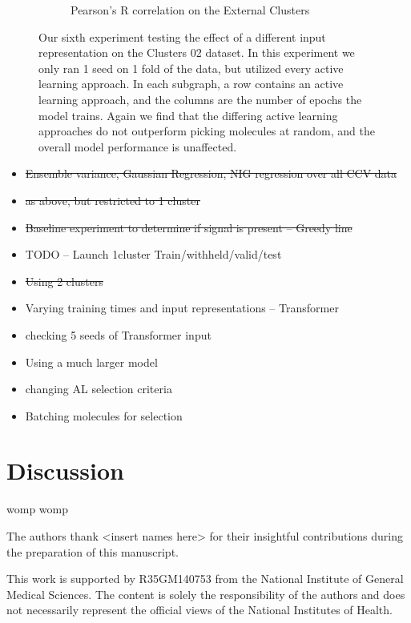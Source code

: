 \documentclass[journal=jmcmar,manuscript=article]{achemso}
\begin{document}
\begin{figure}[tbph]
\begin{subfigure}[b]{0.48\textwidth}
        \caption{Pearson's R correlation on the External Clusters}
    \end{subfigure}
    \caption{Our sixth experiment testing the effect of a different input representation on the Clusters 02 dataset. In this experiment we only ran 1 seed on 1 fold of the data, but utilized every active learning approach. In each subgraph, a row contains an active learning approach, and the columns are the number of epochs the model trains. Again we find that the differing active learning approaches do not outperform picking molecules at random, and the overall model performance is unaffected.}
    \label{fig:MATinput}
\end{figure}

\begin{itemize}
    \item \st{Ensemble variance, Gaussian Regression, NIG regression over all CCV data}
    \item \st{as above, but restricted to 1 cluster}
    \item \st{Baseline experiment to determine if signal is present -- Greedy line}
    \item TODO -- Launch 1cluster Train/withheld/valid/test
    \item \st{Using 2 clusters}
    \item Varying training times and input representations -- Transformer
    \item checking 5 seeds of Transformer input
    \item Using a much larger model
    \item changing AL selection criteria 
    \item Batching molecules for selection
\end{itemize}

\section{Discussion}

womp womp

\begin{acknowledgement}


The authors thank <insert names here> for their insightful contributions during the preparation of this manuscript.

This work is supported by R35GM140753 from the National Institute of General Medical Sciences. The content is solely the responsibility of the authors and does not necessarily represent the official views of the National Institutes of Health.

\end{acknowledgement}
\end{document}
